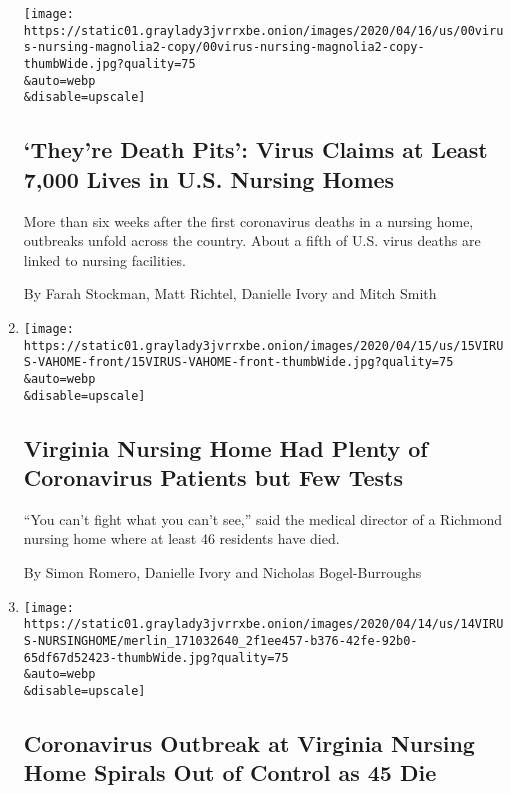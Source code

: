 \begin{enumerate}
  \texttt{[image: https://static01.graylady3jvrrxbe.onion/images/2020/04/16/us/00virus-nursing-magnolia2-copy/00virus-nursing-magnolia2-copy-thumbWide.jpg?quality=75\\\&auto=webp\\\&disable=upscale]}

  \hypertarget{theyre-death-pits-virus-claims-at-least-7000-lives-in-us-nursing-homes}{%
  \subsection{`They're Death Pits': Virus Claims at Least 7,000 Lives in
  U.S. Nursing
  Homes}\label{theyre-death-pits-virus-claims-at-least-7000-lives-in-us-nursing-homes}}

  More than six weeks after the first coronavirus deaths in a nursing
  home, outbreaks unfold across the country. About a fifth of U.S. virus
  deaths are linked to nursing facilities.

  By Farah Stockman, Matt Richtel, Danielle Ivory and Mitch Smith
\item
  \href{/2020/04/15/us/virginia-nursing-home-coronavirus.html}{}

  \texttt{[image: https://static01.graylady3jvrrxbe.onion/images/2020/04/15/us/15VIRUS-VAHOME-front/15VIRUS-VAHOME-front-thumbWide.jpg?quality=75\\\&auto=webp\\\&disable=upscale]}

  \hypertarget{virginia-nursing-home-had-plenty-of-coronavirus-patients-but-few-tests}{%
  \subsection{Virginia Nursing Home Had Plenty of Coronavirus Patients
  but Few
  Tests}\label{virginia-nursing-home-had-plenty-of-coronavirus-patients-but-few-tests}}

  ``You can't fight what you can't see,'' said the medical director of a
  Richmond nursing home where at least 46 residents have died.

  By Simon Romero, Danielle Ivory and Nicholas Bogel-Burroughs
\item
  \href{/2020/04/14/us/coronavirus-nursing-homes.html}{}

  \texttt{[image: https://static01.graylady3jvrrxbe.onion/images/2020/04/14/us/14VIRUS-NURSINGHOME/merlin\_171032640\_2f1ee457-b376-42fe-92b0-65df67d52423-thumbWide.jpg?quality=75\\\&auto=webp\\\&disable=upscale]}

  \hypertarget{coronavirus-outbreak-at-virginia-nursing-home-spirals-out-of-control-as-45-die}{%
  \subsection{Coronavirus Outbreak at Virginia Nursing Home Spirals Out
  of Control as 45
  Die}\label{coronavirus-outbreak-at-virginia-nursing-home-spirals-out-of-control-as-45-die}}


\end{enumerate}
